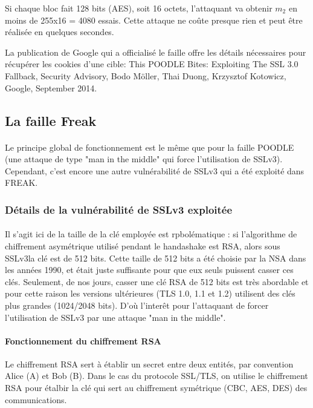 Si chaque bloc fait 128 bits (AES), soit 16 octets, l'attaquant va obtenir $m_2$ en moins de 255x16 = 4080 essais. Cette attaque ne co\^ute presque rien et peut \^etre réalisée en quelques secondes.

La publication de Google qui a officialisé le faille offre les détails nécessaires pour récupérer les cookies d'une cible: This POODLE Bites: Exploiting The SSL 3.0 Fallback, Security Advisory, Bodo Möller, Thai Duong, Krzysztof Kotowicz, Google, September 2014.


\subsection{La faille Freak}
\paragraph{}
Le principe global de fonctionnement est le m\^eme que pour la faille POODLE (une attaque de type "man in the middle" qui force l'utilisation de SSLv3). Cependant, c'est encore une autre vulnérabilité de SSLv3 qui a été exploité dans FREAK.

\subsubsection{Détails de la vulnérabilité de SSLv3 exploitée}
\paragraph{}
Il s'agit ici de la taille de la clé employée est rpbolématique : si l'algorithme de chiffrement asymétrique utilisé pendant le handashake est RSA, alors sous SSLv3la clé est de 512 bits. Cette taille de 512 bits a été choisie par la NSA dans les années 1990, et était juste suffisante pour que eux seuls puissent casser ces clés. Seulement, de nos jours, casser une clé RSA de 512 bits est très abordable et pour cette raison les versions ultérieures  (TLS 1.0, 1.1 et 1.2) utilisent des clés plus grandes (1024/2048 bits). D'où l'inter\^et pour l'attaquant de forcer l'utilisation de SSLv3 par une attaque "man in the middle".

\paragraph{Fonctionnement du chiffrement RSA}

Le chiffrement RSA sert à établir un secret entre deux entités, par convention Alice (A) et Bob (B). Dans le cas du protocole SSL/TLS, on utilise le chiffrement RSA pour étalbir la clé qui sert au chiffrement symétrique (CBC, AES, DES) des communications. 

